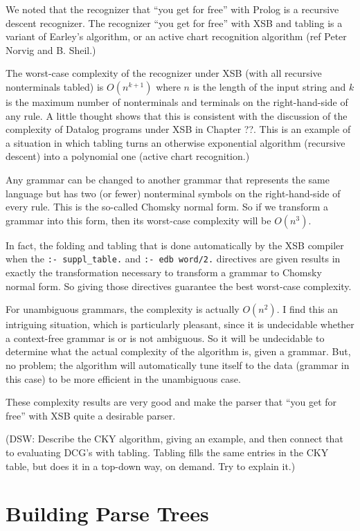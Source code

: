 We noted that the recognizer that ``you get for free'' with Prolog is
a recursive descent recognizer.  The recognizer ``you get for free''
with XSB and tabling is a variant of Earley's algorithm, or an active
chart recognition algorithm (ref Peter Norvig and B. Sheil.)

The worst-case complexity of the recognizer under XSB (with all
recursive nonterminals tabled) is $O(n^{k+1})$ where $n$ is the length
of the input string and $k$ is the maximum number of nonterminals and
terminals on the right-hand-side of any rule.  A little thought shows
that this is consistent with the discussion of the complexity of
Datalog programs under XSB in Chapter ??.  This is an example of a
situation in which tabling turns an otherwise exponential algorithm
(recursive descent) into a polynomial one (active chart recognition.)

Any grammar can be changed to another grammar that represents the same
language but has two (or fewer) nonterminal symbols on the
right-hand-side of every rule.  This is the so-called Chomsky normal
form.  So if we transform a grammar into this form, then its
worst-case complexity will be $O(n^3)$.

In fact, the folding and tabling that is done automatically by the XSB
compiler when the \verb|:- suppl_table.| and \verb|:- edb word/2.|
directives are given results in exactly the transformation necessary
to transform a grammar to Chomsky normal form.  So giving those
directives guarantee the best worst-case complexity.

For unambiguous grammars, the complexity is actually $O(n^2)$.  I find
this an intriguing situation, which is particularly pleasant, since it
is undecidable whether a context-free grammar is or is not ambiguous.
So it will be undecidable to determine what the actual complexity of
the algorithm is, given a grammar.  But, no problem; the algorithm
will automatically tune itself to the data (grammar in this case) to
be more efficient in the unambiguous case.

These complexity results are very good and make the parser that ``you
get for free'' with XSB quite a desirable parser.

(DSW: Describe the CKY algorithm, giving an example, and then connect
that to evaluating DCG's with tabling.  Tabling fills the same entries
in the CKY table, but does it in a top-down way, on demand.  Try to
explain it.)


\section{Building Parse Trees}

